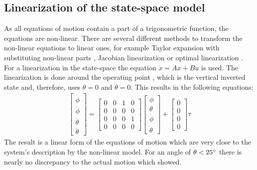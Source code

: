 \subsection{Linearization of the state-space model}
As all equations of motion contain a part of a trigonometric function, the 
equations are non-linear. There are several different methods to transform the 
non-linear equations to linear ones, for example Taylor expansion with 
substituting non-linear parts \citep{hamza2015genetic}, Jacobian 
linearization \citep{al2013experimental} or optimal linearization 
\citep{zhang2011optimal}.
 For a linearization in the state-space the equation 
$\dot{x}=Ax+Bu$ is used. The linearization is done around the 
operating point \citep{furuta1992swing}, which is the vertical inverted 
state and, therefore, uses $\theta = 0$ and $\dot{\theta}=0$. This results in 
the following equations: 
\begin{align}
\begin{bmatrix}
	\dot{\phi}\\
	\ddot{\phi}\\
	\dot{\theta}\\
	\ddot{\theta}
\end{bmatrix}=
\begin{bmatrix}
0	& 0 &1  &0  \\ 
0	&  0& 0 &  0\\ 
0	& 0 & 0 &1  \\ 
0	& 0 & 0 & 0
\end{bmatrix} 
\begin{bmatrix}
	\phi\\ 
	\theta\\ 
	\dot{\phi}\\ 
	\dot{\theta}
\end{bmatrix} +
\begin{bmatrix}
0	\\ 
0	\\ 
0	\\ %
0
\end{bmatrix} \tau
\label{eq:liner}
\end{align}
The result is a linear form of the equations of motion which are very close to 
the system's description by the non-linear model. For an angle of 
$\theta<25\degree$  
there is nearly no discrepancy to the actual motion
which \cite{kurode2011swing} showed.

